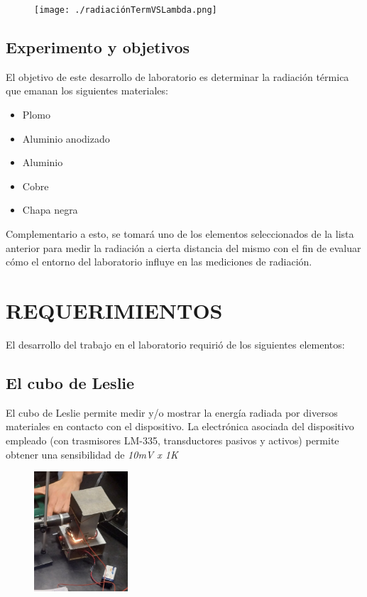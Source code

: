 \documentclass[a4paper]{article}
\begin{document}
			\begin{figure}[h!]
				\centering
				 \texttt{[image: ./radiaciónTermVSLambda.png]}
			\end{figure}

        \subsection{Experimento y objetivos}
            \indent El objetivo de este desarrollo de laboratorio es determinar la radiación térmica que emanan los siguientes materiales: \\
            \vspace{-5mm}            
            \begin{itemize}
                \setlength{\itemsep}{0pt}
                \item Plomo 
                \item Aluminio anodizado
                \item Aluminio
                \item Cobre 
                \item Chapa negra
            \end{itemize}
        
            \indent Complementario a esto, se tomará uno de los elementos seleccionados de la lista anterior para medir la radiación a cierta distancia del mismo con el fin de evaluar cómo el entorno del laboratorio influye en las mediciones de radiación. \\


     \section{REQUERIMIENTOS}
        El desarrollo del trabajo en el laboratorio requirió de los siguientes elementos:
        \subsection{El cubo de Leslie}
            \indent El cubo de Leslie permite medir y/o mostrar la energía radiada por diversos materiales en contacto con el dispositivo. 
            \newpage
            \noindent
            \indent La electrónica asociada del dispositivo empleado (con trasmisores LM-335, transductores pasivos y activos) permite obtener una sensibilidad de \textit{10mV x 1\textdegree K} \\

			\begin{figure}[h!]
				\centering
				\includegraphics[width =3.5cm]{./leslie.jpeg}
			\end{figure}
\end{document}

